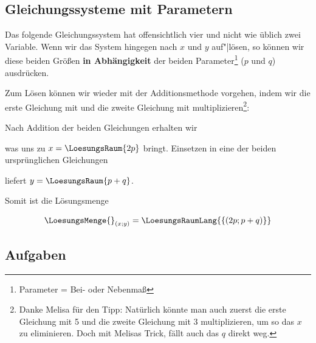 \subsection{Gleichungssysteme mit Parametern}
Das folgende Gleichungssystem hat offensichtlich vier und nicht wie
üblich zwei Variable. Wenn wir das System hingegen nach $x$ und $y$
auf"|lösen, so können wir diese beiden Größen
\textbf{in Abhängigkeit} der beiden Parameter\footnote{Parameter =
  Bei- oder Nebenmaß} ($p$ und $q$) ausdrücken.


Zum Lösen können wir wieder mit der Additionsmethode vorgehen, indem
wir die erste Gleichung mit  und die zweite Gleichung mit  multiplizieren\footnote{Danke Melisa für den Tipp: Natürlich könnte man auch zuerst die erste Gleichung mit 5 und die zweite Gleichung mit 3 multiplizieren, um so das $x$ zu eliminieren. Doch mit Melisas Trick, fällt auch das $q$ direkt weg.
}:


Nach Addition der beiden Gleichungen erhalten wir


was uns zu $x=\LoesungsRaum{2p}$ bringt.
Einsetzen in eine der beiden ursprünglichen Gleichungen


liefert $y=\LoesungsRaum{p+q}$.


Somit ist die Lösungsmenge


$$\LoesungsMenge{}_{(x;y)} = \LoesungsRaumLang{\left\{(2p; p+q)\right\}}$$
\newpage

\subsection*{Aufgaben}

\newpage
  

\newpage
